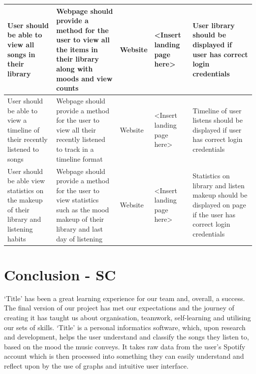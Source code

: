 \documentclass[10pt]{report}
\begin{document}
\begin{center}
\begin{longtable}{| p{2.5cm} | p{6cm} | p{2cm} | p{2cm} | p{2.5cm} | }
\hline
User should be able to view all songs in their library&
Webpage should provide a method for the user to view all the items in their library along with moods and view counts&
Website&
<Insert landing page here>&
User library should be displayed if user has correct login credentials \\
\hline
User should be able to view a timeline of their recently listened to songs&
Webpage should provide a method for the user to view all their recently listened to track in a timeline format&
Website&
<Insert landing page here>&
Timeline of user listens should be displayed if user has correct login credentials \\
\hline
User should be able view statistics on the makeup of their library and listening habits&
Webpage should provide a method for the user to view statistics such as the mood makeup of their library and last day of listening&
Website&
<Insert landing page here>&
Statistics on library and listen makeup should be displayed on page if the user has correct login credentials \\
\hline


\end{longtable}

\end{center}

\chapter{Conclusion  - SC}

‘Title’ has been a great learning experience for our team and, overall, a success. The final version of our project has met our expectations and the journey of creating it has taught us about organisation, teamwork, self-learning and utilising our sets of skills. ‘Title’ is a personal informatics software, which, upon research and development, helps the user understand and classify the songs they listen to, based on the mood the music conveys. It takes raw data from the user’s Spotify account which is then processed into something they can easily understand and reflect upon by the use of graphs and intuitive user interface. 
\end{document}
